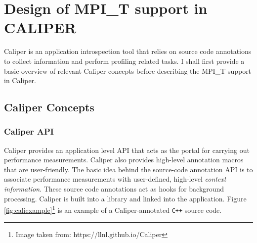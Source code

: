 \chapter{Design of MPI\_T support in CALIPER}

Caliper is an application introspection tool that relies on source code annotations to collect information and perform profiling related tasks. I shall first provide a basic overview of relevant Caliper concepts before describing the MPI\_T support in Caliper. 

\section{Caliper Concepts}
\subsection{Caliper API}
Caliper provides an application level API that acts as the portal for carrying out performance measurements. Caliper also provides high-level annotation macros that are user-friendly. The basic idea behind the source-code annotation API is to associate performance measurements with user-defined, high-level \textit{context information}. These source code annotations act as hooks for background processing. Caliper is built into a library and linked into the application. Figure \ref{fig:caliexample}\footnote{Image taken from: https://llnl.github.io/Caliper} is an example of a Caliper-annotated \verb+C+\texttt{++} source code.
